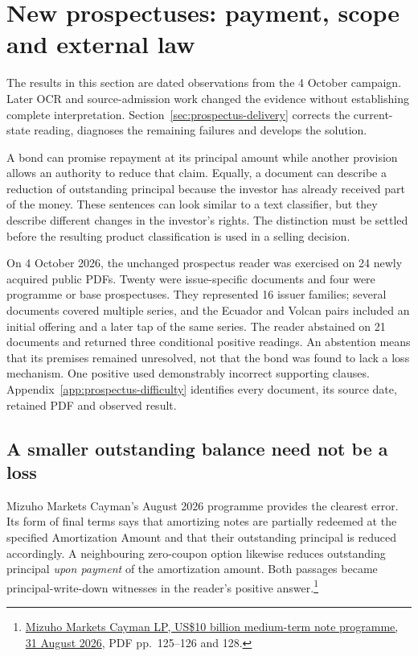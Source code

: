 \section{New prospectuses: payment, scope and external law}
\label{sec:prospectus-difficulty}

The results in this section are dated observations from the 4 October campaign.
Later OCR and source-admission work changed the evidence without establishing
complete interpretation. Section~\ref{sec:prospectus-delivery} corrects the
current-state reading, diagnoses the remaining failures and develops the solution.

A bond can promise repayment at its principal amount while another provision
allows an authority to reduce that claim. Equally, a document can describe a
reduction of outstanding principal because the investor has already received
part of the money. These sentences can look similar to a text classifier, but
they describe different changes in the investor's rights. The distinction
must be settled before the resulting product classification is used in a
selling decision.

On 4 October 2026, the unchanged prospectus reader was exercised on 24 newly
acquired public PDFs. Twenty were issue-specific documents and four were
programme or base prospectuses. They represented 16 issuer families; several
documents covered multiple series, and the Ecuador and Volcan pairs included
an initial offering and a later tap of the same series. The reader abstained
on 21 documents and returned three conditional positive readings. An abstention
means that its premises remained unresolved, not that the bond was found to
lack a loss mechanism. One positive used demonstrably incorrect supporting
clauses. Appendix~\ref{app:prospectus-difficulty} identifies every document,
its source date, retained PDF and observed result.

\subsection{A smaller outstanding balance need not be a loss}

Mizuho Markets Cayman's August 2026 programme provides the clearest error.
Its form of final terms says that amortizing notes are partially redeemed at
the specified Amortization Amount and that their outstanding principal is
reduced accordingly. A neighbouring zero-coupon option likewise reduces
outstanding principal \emph{upon payment} of the amortization amount. Both
passages became principal-write-down witnesses in the reader's positive
answer.\footnote{\href{../prospectus/difficulty-2026-10-04/pdfs/case-105635287.pdf}
{Mizuho Markets Cayman LP, US\$10 billion medium-term note programme,
31 August 2026}, PDF pp.~125--126 and 128.}


